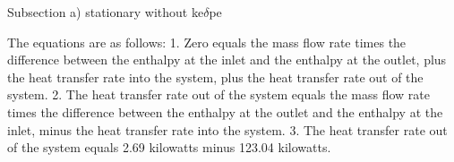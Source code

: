 Subsection a) stationary without ke$\delta$pe

The equations are as follows:
1. Zero equals the mass flow rate times the difference between the enthalpy at the inlet and the enthalpy at the outlet, plus the heat transfer rate into the system, plus the heat transfer rate out of the system.
2. The heat transfer rate out of the system equals the mass flow rate times the difference between the enthalpy at the outlet and the enthalpy at the inlet, minus the heat transfer rate into the system.
3. The heat transfer rate out of the system equals 2.69 kilowatts minus 123.04 kilowatts.